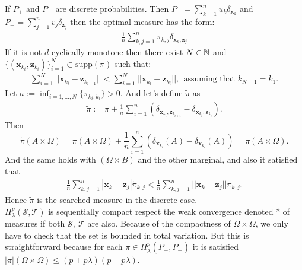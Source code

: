 {If $P_+$ and $P_-$ are discrete probabilities}. Then $P_+=\sum_{k=1}^n u_k\delta_{\textbf{x}_k}$ and $P_-=\sum_{j=1}^n v_j\delta_{\textbf{z}_j}$ then the optimal measure has the form: 
\begin{align}
 \frac{1}{n}\sum_{k,j=1}^n \pi_{k,j}\delta_{\textbf{x}_k,\textbf{z}_j}
\end{align}
If it is not $d$-cyclically monotone then there exist $N\in \mathbb{N}$ and $\{(\textbf{x}_{k_i},\textbf{z}_{k_i})\}_{i=1}^N \subset \text{supp}(\pi)$ such that:
\begin{align*}
\sum_{i=1}^{N}||\textbf{x}_{k_i}-\textbf{z}_{k_{i+1}} ||<\sum_{i=1}^{N}||\textbf{x}_{k_i}-\textbf{z}_{k_i} ||, \ \ \text{assuming that  } k_{N+1}=k_1.
\end{align*}
Let $a:=\inf_{i=1,\dots, N}\{ \pi_{k_i,k_i} \}>0$. And let's define $\tilde{\pi}$ as 
\begin{align*}
\tilde{\pi}:=\pi+\frac{1}{n}\sum_{i=1}^n \left( \delta_{\textbf{x}_{k_{i}},\textbf{z}_{k_{i+1}}}-\delta_{\textbf{x}_{k_{i}},\textbf{z}_{k_{i}}}\right).
\end{align*}
Then $$\tilde{\pi}(A\times \Omega)=\pi(A\times \Omega)+\frac{1}{n}\sum_{i=1}^n \left( \delta_{\textbf{x}_{k_{i}}}(A)-\delta_{\textbf{x}_{k_{i}}}(A)\right)=\pi(A\times \Omega).$$
And the same holds with $ ( \Omega\times B) $ and the other marginal, and also it satisfied that
\begin{align*}
\frac{1}{n}\sum_{k,j=1}^n | \textbf{x}_k-\textbf{z}_j|\tilde{\pi}_{k,j}< \frac{1}{n}\sum_{k,j=1}^n || \textbf{x}_k-\textbf{z}_j||\pi_{k,j}.
\end{align*}
Hence $\tilde{\pi}$ is the searched measure in the discrete case.
\\
{$\Pi^p_{\lambda}(\mathcal{S}, \mathcal{T})$ is sequentially compact respect the weak convergence denoted * of measures if both $\mathcal{S},\ \mathcal{T}$ are also.}
Because of the compactness of $\Omega \times \Omega$, we only have to check that the set is bounded in total variation. But this is straightforward because for each $\pi \in \Pi^p_{\lambda}(P_+, P_-) $ it is satisfied $|\pi|(\Omega\times \Omega)\leq (p+p\lambda)(p+p\lambda)$.
\\
